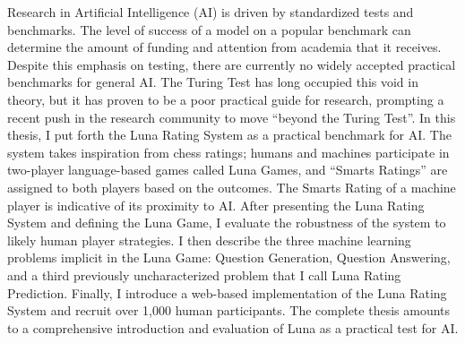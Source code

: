 
Research in Artificial Intelligence (AI) is driven by standardized tests and benchmarks. The level of success of a model on a popular benchmark can determine the amount of funding and attention from academia that it receives. Despite this emphasis on testing, there are currently no widely accepted practical benchmarks for general AI. The Turing Test has long occupied this void in theory, but it has proven to be a poor practical guide for research, prompting a recent push in the research community to move ``beyond the Turing Test''. In this thesis, I put forth the Luna Rating System as a practical benchmark for AI. The system takes inspiration from chess ratings; humans and machines participate in two-player language-based games called Luna Games, and ``Smarts Ratings'' are assigned to both players based on the outcomes. The Smarts Rating of a machine player is indicative of its proximity to AI. After presenting the Luna Rating System and defining the Luna Game, I evaluate the robustness of the system to likely human player strategies. I then describe the three machine learning problems implicit in the Luna Game: Question Generation, Question Answering, and a third previously uncharacterized problem that I call Luna Rating Prediction. Finally, I introduce a web-based implementation of the Luna Rating System and recruit over 1,000 human participants. The complete thesis amounts to a comprehensive introduction and evaluation of Luna as a practical test for AI.